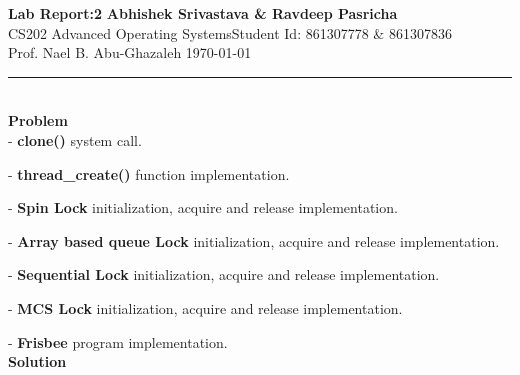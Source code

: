 \documentclass[a4paper, 11pt]{article}
\begin{document}
\noindent
\large\textbf{Lab Report:2} \hfill \textbf{Abhishek Srivastava \& Ravdeep Pasricha} \\
\normalsize CS202 Advanced Operating Systems\hfill Student Id: 861307778 \& 861307836 \\
Prof. Nael B. Abu-Ghazaleh \hfill \today \\
\hrule

\noindent
\\
\large\textbf{Problem}\\

- \textbf{clone()} system call.

- \textbf{thread\_create()} function implementation.

- \textbf{Spin Lock} initialization, acquire and release implementation.

- \textbf{Array based queue Lock} initialization, acquire and release implementation.

- \textbf{Sequential Lock} initialization, acquire and release implementation.

- \textbf{MCS Lock} initialization, acquire and release implementation.

- \textbf{Frisbee} program implementation.\\

\noindent
\large\textbf{Solution}\\
\end{document}

